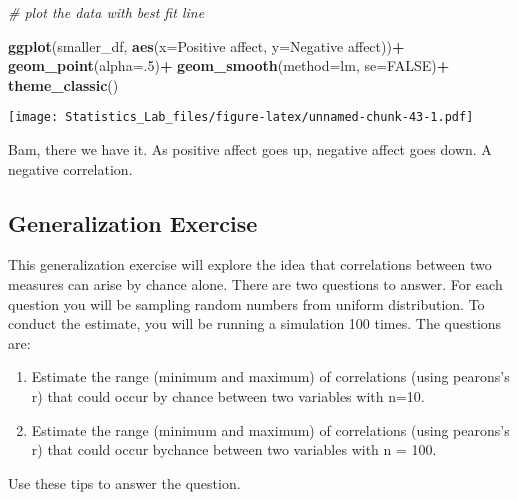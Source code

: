 \documentclass[
]{book}
\newenvironment{Shaded}{\begin{snugshade}}{\end{snugshade}}
\newcommand{\AttributeTok}[1]{\textcolor[rgb]{0.13,0.29,0.53}{#1}}
\newcommand{\CommentTok}[1]{\textcolor[rgb]{0.56,0.35,0.01}{\textit{#1}}}
\newcommand{\ConstantTok}[1]{\textcolor[rgb]{0.56,0.35,0.01}{#1}}
\newcommand{\DecValTok}[1]{\textcolor[rgb]{0.00,0.00,0.81}{#1}}
\newcommand{\FunctionTok}[1]{\textcolor[rgb]{0.13,0.29,0.53}{\textbf{#1}}}
\newcommand{\NormalTok}[1]{#1}
\newcommand{\SpecialCharTok}[1]{\textcolor[rgb]{0.81,0.36,0.00}{\textbf{#1}}}
\newcommand{\StringTok}[1]{\textcolor[rgb]{0.31,0.60,0.02}{#1}}
\begin{document}
\begin{Shaded}
\begin{Highlighting}[]
\CommentTok{\# plot the data with best fit line}

\FunctionTok{ggplot}\NormalTok{(smaller\_df, }\FunctionTok{aes}\NormalTok{(}\AttributeTok{x=}\StringTok{\textasciigrave{}}\AttributeTok{Positive affect}\StringTok{\textasciigrave{}}\NormalTok{,}
                     \AttributeTok{y=}\StringTok{\textasciigrave{}}\AttributeTok{Negative affect}\StringTok{\textasciigrave{}}\NormalTok{))}\SpecialCharTok{+}
  \FunctionTok{geom\_point}\NormalTok{(}\AttributeTok{alpha=}\NormalTok{.}\DecValTok{5}\NormalTok{)}\SpecialCharTok{+}
  \FunctionTok{geom\_smooth}\NormalTok{(}\AttributeTok{method=}\NormalTok{lm, }\AttributeTok{se=}\ConstantTok{FALSE}\NormalTok{)}\SpecialCharTok{+}
  \FunctionTok{theme\_classic}\NormalTok{()}
\end{Highlighting}
\end{Shaded}

\texttt{[image: Statistics\_Lab\_files/figure-latex/unnamed-chunk-43-1.pdf]}

Bam, there we have it. As positive affect goes up, negative affect goes down. A negative correlation.

\hypertarget{generalization-exercise-2}{%
\subsection{Generalization Exercise}\label{generalization-exercise-2}}

This generalization exercise will explore the idea that correlations between two measures can arise by chance alone. There are two questions to answer. For each question you will be sampling random numbers from uniform distribution. To conduct the estimate, you will be running a simulation 100 times. The questions are:

\begin{enumerate}
\def\labelenumi{\arabic{enumi}.}
\item
  Estimate the range (minimum and maximum) of correlations (using pearons's r) that could occur by chance between two variables with n=10.
\item
  Estimate the range (minimum and maximum) of correlations (using pearons's r) that could occur bychance between two variables with n = 100.
\end{enumerate}

Use these tips to answer the question.
\end{document}
